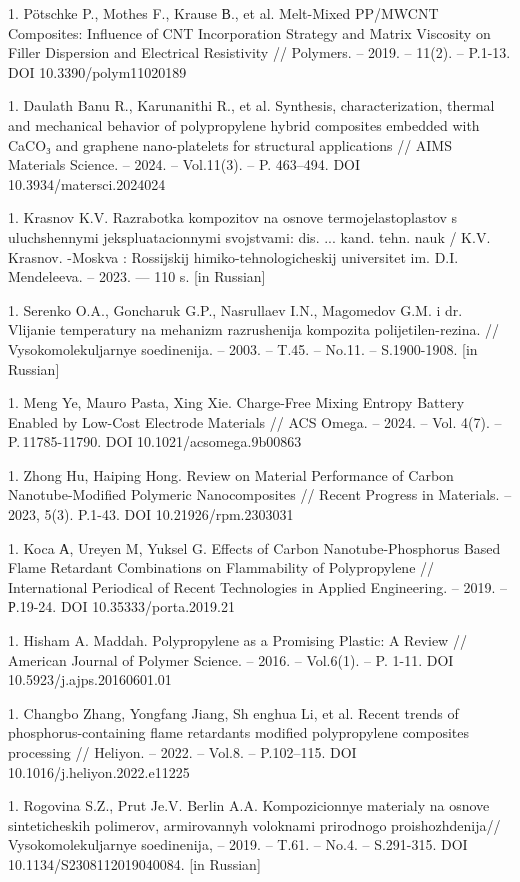 1. Pötschke P., Mothes F., Krause В., et al. Melt-Mixed PP/MWCNT
Composites: Influence of CNT Incorporation Strategy and Matrix
Viscosity on Filler Dispersion and Electrical Resistivity // Polymers.
-- 2019. -- 11(2). -- P.1-13. DOI 10.3390/polym11020189

1. Daulath Banu R., Karunanithi R., et al. Synthesis, characterization,
thermal and mechanical behavior of polypropylene hybrid composites
embedded with CaCO₃ and graphene nano-platelets for structural
applications // AIMS Materials Science. -- 2024. -- Vol.11(3). -- P.
463--494. DOI 10.3934/matersci.2024024

1. Krasnov K.V. Razrabotka kompozitov na osnove termojelastoplastov s
uluchshennymi jekspluatacionnymi svojstvami: dis. ... kand. tehn. nauk
/ K.V. Krasnov. -Moskva : Rossijskij himiko-tehnologicheskij
universitet im. D.I. Mendeleeva. -- 2023. --- 110 s. {[}in Russian{]}

1. Serenko O.A., Goncharuk G.P., Nasrullaev I.N., Magomedov G.M. i dr.
Vlijanie temperatury na mehanizm razrushenija kompozita
polijetilen-rezina. // Vysokomolekuljarnye soedinenija. -- 2003. --
T.45. -- No.11. -- S.1900-1908. {[}in Russian{]}

1. Meng Ye, Mauro Pasta, Xing Xie. Charge-Free Mixing Entropy Battery
Enabled by Low-Cost Electrode Materials // ACS Omega. -- 2024. -- Vol.
4(7). -- P.\,11785-11790. DOI 10.1021/acsomega.9b00863

1. Zhong Hu, Haiping Hong. Review on Material Performance of Carbon
Nanotube-Modified Polymeric Nanocomposites // Recent Progress in
Materials. -- 2023, 5(3). P.1-43. DOI 10.21926/rpm.2303031

1. Koca А, Ureyen M, Yuksel G. Effects of Carbon Nanotube-Phosphorus
Based Flame Retardant Combinations on Flammability of Polypropylene //
International Periodical of Recent Technologies in Applied
Engineering. -- 2019. -- Р.19-24. DOI 10.35333/porta.2019.21

1. Hisham A. Maddah. Polypropylene as a Promising Plastic: A Review //
American Journal of Polymer Science. -- 2016. -- Vol.6(1). -- P.
1-11. DOI 10.5923/j.ajps.20160601.01

1. Changbo Zhang, Yongfang Jiang, Sh enghua Li, et al. Recent trends of
phosphorus-containing flame retardants modified polypropylene
composites processing // Heliyon. -- 2022. -- Vol.8. -- P.102--115.
DOI 10.1016/j.heliyon.2022.e11225

1. Rogovina S.Z., Prut Je.V. Berlin A.A. Kompozicionnye materialy na
osnove sinteticheskih polimerov, armirovannyh voloknami prirodnogo
proishozhdenija// Vysokomolekuljarnye soedinenija, -- 2019. -- T.61.
-- No.4. -- S.291-315. DOI 10.1134/S2308112019040084. {[}in
Russian{]}

